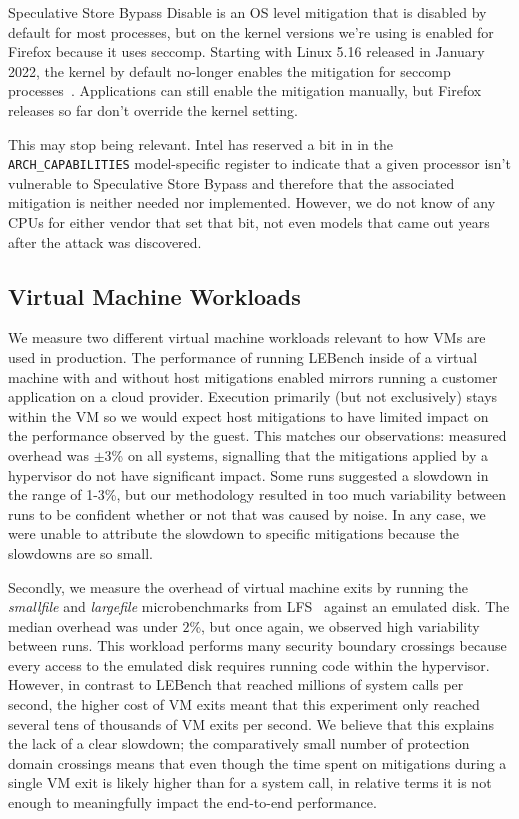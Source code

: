 Speculative Store Bypass Disable is an OS level mitigation that is disabled by default for most processes, but on the kernel versions we're using is enabled for Firefox because it uses seccomp.
Starting with Linux 5.16 released in January 2022, the kernel by default no-longer enables the mitigation for seccomp processes~\cite{phoronix:ssbd-defaults}.
Applications can still enable the mitigation manually, but Firefox releases so far don't override the kernel setting.

This may stop being relevant.
Intel has reserved a bit in in the \texttt{ARCH\_CAPABILITIES} model-specific register to indicate that a given processor isn't vulnerable to Speculative Store Bypass and therefore that the associated mitigation is neither needed nor implemented.
However, we do not know of any CPUs for either vendor that set that bit, not even models that came out years after the attack was discovered.

\subsection{Virtual Machine Workloads}
\label{sec:benchmarks:vm}

We measure two different virtual machine workloads relevant to how VMs are used in production.
The performance of running LEBench inside of a virtual machine with and without host mitigations enabled mirrors running a customer application on a cloud provider.
Execution primarily (but not exclusively) stays within the VM so we would expect host mitigations to have limited impact on the performance observed by the guest.
This matches our observations: measured overhead was $\pm 3$\% on all systems, signalling that the mitigations applied by a hypervisor do not have significant impact.
Some runs suggested a slowdown in the range of 1-3\%, but our methodology resulted in too much variability between runs to be confident whether or not that was caused by noise. 
In any case, we were unable to attribute the slowdown to specific mitigations because the slowdowns are so small.

Secondly, we measure the overhead of virtual machine exits by running the \textit{smallfile} and \textit{largefile} microbenchmarks from LFS~\cite{rosenblum:lfs} against an emulated disk.
The median overhead was under $2$\%, but once again, we observed high variability between runs.
This workload performs many security boundary crossings because every access to the emulated disk requires running code within the hypervisor.
However, in contrast to LEBench that reached millions of system calls per second, the higher cost of VM exits meant that this experiment only reached several tens of thousands of VM exits per second.
We believe that this explains the lack of a clear slowdown; the comparatively small number of protection domain crossings means that even though the time spent on mitigations during a single VM exit is likely higher than for a system call, in relative terms it is not enough to meaningfully impact the end-to-end performance.

